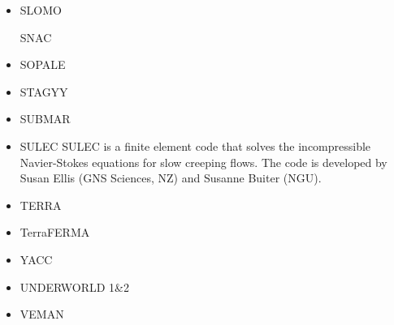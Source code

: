 \begin{itemize}
\item SLOMO
\cite{kaus05}

\index SNAC
\cite{chlg08}


\item SOPALE

\cite{wibe94}
\cite{befh94}
\cite{full95}
\cite{elfb95}
\cite{bekh96}
\cite{will99}
\cite{pybf00}
\cite{bemh00}
\cite{bejn01}
\cite{hube02}
\cite{pybf02}
\cite{hube03}
\cite{vamf03}
\cite{wipo03}
\cite{pymi03}
\cite{bejn04}
\cite{pycr04}
\cite{pybe04}
\cite{elsp04}
\cite{geim04}
\cite{gebi05}
\cite{hubb05}
\cite{pysk06}
\cite{selz06}
\cite{hube07}
\cite{cubh07}
\cite{mohb07}
\cite{sebp08}
\cite{wabj08}
\cite{wabj08b}
\cite{kecw09}
\cite{bejb09}
\cite{bupb09}
\cite{grba09}
\cite{sihb09}
\cite{albs10}
\cite{albe10}
\cite{grpy10}
\cite{pygp10}
\cite{cube11}
\cite{bubj11}
\cite{hube11}
\cite{grpy12}
\cite{grpy12b}
\cite{kogp12}
\cite{grbe12}
\cite{jahu12}
\cite{bubj13}
\cite{chbe13}
\cite{fihv13a}
\cite{fihv13b}
\cite{gobi13}
\cite{grpy13}
\cite{knak13}
\cite{nipc13}
\cite{jahm13}
\cite{gogu14}
\cite{albe15}
\cite{bubj15}
\cite{heps15}
\cite{licu16}
\cite{bube17}


\item STAGYY
\cite{rota11}
\cite{yadl14}
\cite{crta14}


\item SUBMAR
\cite{masr06}
\cite{masp07}
\cite{roms10}


\item SULEC
SULEC is a finite element code that solves the incompressible Navier-Stokes equations 
for slow creeping flows. The code is developed by Susan Ellis 
(GNS Sciences, NZ) and Susanne Buiter (NGU). 

\cite{qube11}
\cite{ellw11}
\cite{buit12}
\cite{tebu12} 
\cite{crsg12}
\cite{grel12}
\cite{ghbu13}
\cite{ghbu14}
\cite{qubu14}
\cite{nabu15}
\cite{zwsn16}
\cite{tebu17}










\item TERRA
\cite{burb97}
\cite{burl98}
\cite{phbs09}
\cite{wodd09}
\cite{woda11}
\cite{dadb13}
\cite{vade16}

\item TerraFERMA
\cite{wisv14}
\cite{wisv17}
\cite{spmw16}
\cite{ceww17}
\cite{ceww19}


\item YACC
\cite{tosn15}
\cite{tomy16}

\item UNDERWORLD 1\&2
\cite{stfs06}
\cite{moql07} 
\cite{stfs07}
\cite{lemm08}
\cite{ozrs08}
\cite{casm10}
\cite{mamb10}
\cite{stsf10}
\cite{stfc10}
\cite{fasm10}
\cite{cafz11}
\cite{cafa12}
\cite{bemm13}
\cite{scmo13}
\cite{faca13}
\cite{famc14}
\cite{quxm15}
\cite{bemm15}
\cite{scsp15}
\cite{shmj15}
\cite{shmv16}
\cite{onlw16}
\cite{kicf16}
\cite{memm18}
\cite{samo19}
\cite{yamg19}

\item VEMAN
\cite{bepo10}


\end{itemize}
